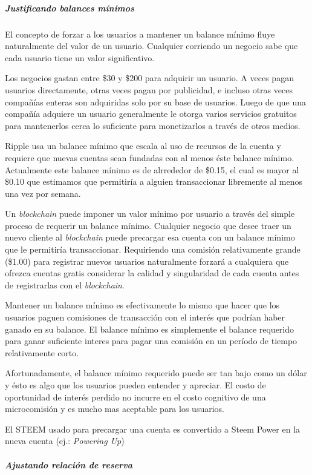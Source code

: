 \documentclass[a4paper,titlepage,final]{article}
\begin{document}
\subparagraph{Justificando balances mínimos}

El concepto de forzar a los usuarios a mantener un balance mínimo fluye naturalmente del valor de un usuario\cite{11}. Cualquier corriendo un negocio sabe que cada usuario tiene un valor significativo.

Los negocios gastan entre \$30 y \$200 para adquirir un usuario. A veces pagan usuarios directamente, otras veces pagan por publicidad, e incluso otras veces compañías enteras son adquiridas solo por su base de usuarios. Luego de que una compañía adquiere un usuario generalmente le otorga varios servicios gratuitos para mantenerlos cerca lo suficiente para monetizarlos a través de otros medios.

Ripple usa un balance mínimo \cite{12} que escala al uso de recursos de la cuenta y requiere que nuevas cuentas sean fundadas con al menos éste balance mínimo. Actualmente este balance mínimo es de alrrededor de \$0.15, el cual es mayor al \$0.10 que estimamos que permitiría a alguien transaccionar libremente al menos una vez por semana.

Un \textit{blockchain} puede imponer un valor mínimo por usuario a través del simple proceso de requerir un balance mínimo. Cualquier negocio que desee traer un nuevo cliente al \textit{blockchain} puede precargar esa cuenta con un balance mínimo que le permitiría transaccionar. Requiriendo una comisión relativamente grande (\$1.00) para registrar nuevos usuarios naturalmente forzará a cualquiera que ofrezca cuentas gratis considerar la calidad y singularidad de cada cuenta antes de registrarlas con el \textit{blockchain}.

Mantener un balance mínimo es efectivamente lo mismo que hacer que los usuarios paguen comisiones de transacción con el interés que podrían haber ganado en su balance. El balance mínimo es simplemente el balance requerido para ganar suficiente interes para pagar una comisión en un período de tiempo relativamente corto.

Afortunadamente, el balance mínimo requerido puede ser tan bajo como un dólar y ésto es algo que los usuarios pueden entender y apreciar. El costo de oportunidad de interés perdido no incurre en el costo cognitivo de una microcomisión y es mucho mas aceptable para los usuarios.

El STEEM usado para precargar una cuenta es convertido a Steem Power en la nueva cuenta (ej.: \textit{Powering Up})

\subparagraph{Ajustando relación de reserva}
\end{document}

